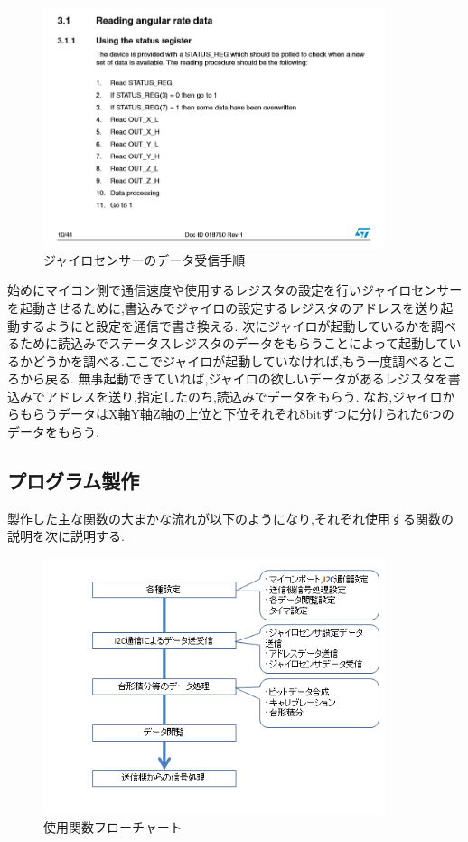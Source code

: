 \documentclass[12pt,oneside]{paper}
\begin{document}
\begin{figure}[H]
  \begin{center}
    \includegraphics[width=100mm]{ga/gyro_m.png}
    \end{center}
  \caption{ジャイロセンサーのデータ受信手順}
 \label{fig:gyro_m}
\end{figure}

始めにマイコン側で通信速度や使用するレジスタの設定を行いジャイロセンサーを起動させるために,書込みでジャイロの設定するレジスタのアドレスを送り起動するようにと設定を通信で書き換える.
次にジャイロが起動しているかを調べるために読込みでステータスレジスタのデータをもらうことによって起動しているかどうかを調べる.ここでジャイロが起動していなければ,もう一度調べるところから戻る.
無事起動できていれば,ジャイロの欲しいデータがあるレジスタを書込みでアドレスを送り,指定したのち,読込みでデータをもらう.
なお,ジャイロからもらうデータはX軸Y軸Z軸の上位と下位それぞれ8bitずつに分けられた6つのデータをもらう.

\subsection{プログラム製作}製作した主な関数の大まかな流れが以下のようになり,それぞれ使用する関数の説明を次に説明する.

\begin{figure}[H]
  \begin{center}
    \includegraphics[width=100mm]{ga/kanflo.png}
    \end{center}
  \caption{使用関数フローチャート}
 \label{fig:kanflo}
\end{figure}
\end{document}
